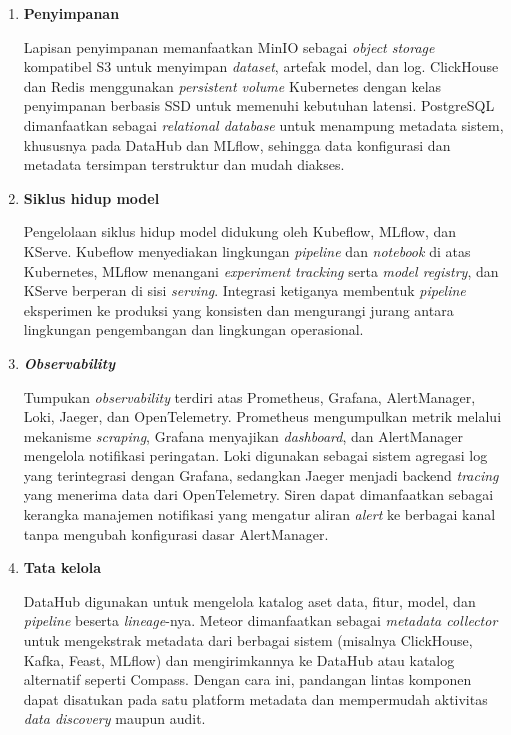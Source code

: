 \begin{enumerate}
    \vspace{0.5em}
    
    \item \textbf{Penyimpanan}
    
    Lapisan penyimpanan memanfaatkan MinIO sebagai \textit{object storage} kompatibel S3 untuk menyimpan \textit{dataset}, artefak model, dan log. ClickHouse dan Redis menggunakan \textit{persistent volume} Kubernetes dengan kelas penyimpanan berbasis SSD untuk memenuhi kebutuhan latensi. PostgreSQL dimanfaatkan sebagai \textit{relational database} untuk menampung metadata sistem, khususnya pada DataHub dan MLflow, sehingga data konfigurasi dan metadata tersimpan terstruktur dan mudah diakses.
    
    \vspace{0.5em}
    
    \item \textbf{Siklus hidup model}
    
    Pengelolaan siklus hidup model didukung oleh Kubeflow, MLflow, dan KServe. Kubeflow menyediakan lingkungan \textit{pipeline} dan \textit{notebook} di atas Kubernetes, MLflow menangani \textit{experiment tracking} serta \textit{model registry}, dan KServe berperan di sisi \textit{serving}. Integrasi ketiganya membentuk \textit{pipeline} eksperimen ke produksi yang konsisten dan mengurangi jurang antara lingkungan pengembangan dan lingkungan operasional.
    
    \vspace{0.5em}
    
    \item \textbf{\textit{Observability}}
    
    Tumpukan \textit{observability} terdiri atas Prometheus, Grafana, AlertManager, Loki, Jaeger, dan OpenTelemetry. Prometheus mengumpulkan metrik melalui mekanisme \textit{scraping}, Grafana menyajikan \textit{dashboard}, dan AlertManager mengelola notifikasi peringatan. Loki digunakan sebagai sistem agregasi log yang terintegrasi dengan Grafana, sedangkan Jaeger menjadi backend \textit{tracing} yang menerima data dari OpenTelemetry. Siren dapat dimanfaatkan sebagai kerangka manajemen notifikasi yang mengatur aliran \textit{alert} ke berbagai kanal tanpa mengubah konfigurasi dasar AlertManager.
    
    \vspace{0.5em}
    
    \item \textbf{Tata kelola}
    
    DataHub digunakan untuk mengelola katalog aset data, fitur, model, dan \textit{pipeline} beserta \textit{lineage}-nya. Meteor dimanfaatkan sebagai \textit{metadata collector} untuk mengekstrak metadata dari berbagai sistem (misalnya ClickHouse, Kafka, Feast, MLflow) dan mengirimkannya ke DataHub atau katalog alternatif seperti Compass. Dengan cara ini, pandangan lintas komponen dapat disatukan pada satu platform metadata dan mempermudah aktivitas \textit{data discovery} maupun audit.
    

\end{enumerate}
